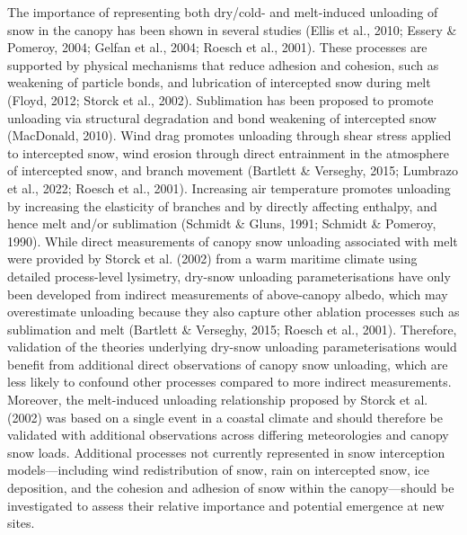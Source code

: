 \documentclass[
  letterpaper,
]{tex/uofsthesis-cs}
\begin{document}
The importance of representing both dry/cold- and melt-induced unloading
of snow in the canopy has been shown in several studies (Ellis et al.,
2010; Essery \& Pomeroy, 2004; Gelfan et al., 2004; Roesch et al.,
2001). These processes are supported by physical mechanisms that reduce
adhesion and cohesion, such as weakening of particle bonds, and
lubrication of intercepted snow during melt (Floyd, 2012; Storck et al.,
2002). Sublimation has been proposed to promote unloading via structural
degradation and bond weakening of intercepted snow (MacDonald, 2010).
Wind drag promotes unloading through shear stress applied to intercepted
snow, wind erosion through direct entrainment in the atmosphere of
intercepted snow, and branch movement (Bartlett \& Verseghy, 2015;
Lumbrazo et al., 2022; Roesch et al., 2001). Increasing air temperature
promotes unloading by increasing the elasticity of branches and by
directly affecting enthalpy, and hence melt and/or sublimation (Schmidt
\& Gluns, 1991; Schmidt \& Pomeroy, 1990). While direct measurements of
canopy snow unloading associated with melt were provided by Storck et
al. (2002) from a warm maritime climate using detailed process-level
lysimetry, dry-snow unloading parameterisations have only been developed
from indirect measurements of above-canopy albedo, which may
overestimate unloading because they also capture other ablation
processes such as sublimation and melt (Bartlett \& Verseghy, 2015;
Roesch et al., 2001). Therefore, validation of the theories underlying
dry-snow unloading parameterisations would benefit from additional
direct observations of canopy snow unloading, which are less likely to
confound other processes compared to more indirect measurements.
Moreover, the melt-induced unloading relationship proposed by Storck et
al. (2002) was based on a single event in a coastal climate and should
therefore be validated with additional observations across differing
meteorologies and canopy snow loads. Additional processes not currently
represented in snow interception models---including wind redistribution
of snow, rain on intercepted snow, ice deposition, and the cohesion and
adhesion of snow within the canopy---should be investigated to assess
their relative importance and potential emergence at new sites.
\end{document}
